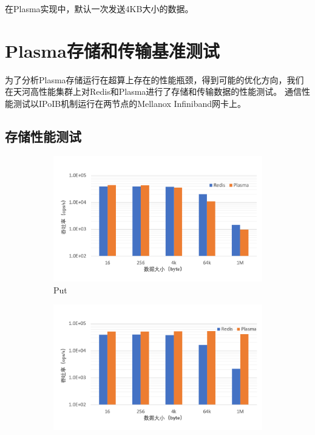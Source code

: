 在Plasma实现中，默认一次发送4KB大小的数据。

\section{Plasma存储和传输基准测试}

为了分析Plasma存储运行在超算上存在的性能瓶颈，得到可能的优化方向，我们在天河高性能集群上对Redis和Plasma进行了存储和传输数据的性能测试。
通信性能测试以IPoIB机制运行在两节点的Mellanox Infiniband网卡上。

\subsection{存储性能测试}

\begin{figure}[h]
    \begin{subfigure}{0.49\textwidth}
        \includegraphics[width=\textwidth]{image/chap02/set.png}
        \caption{Put}
    \end{subfigure}
    \begin{subfigure}{0.49\textwidth}
        \includegraphics[width=\textwidth]{image/chap02/get.png}

\end{subfigure}
\end{figure}
